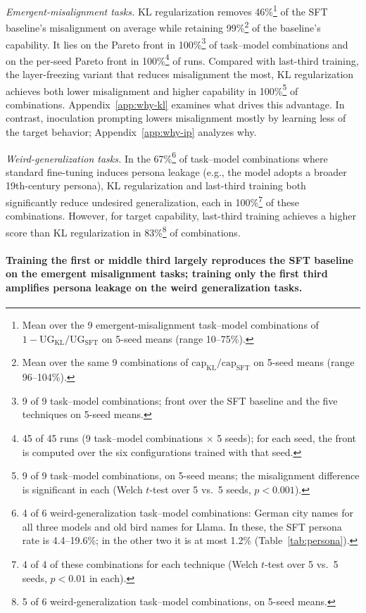 \documentclass[11pt]{article}
\newenvironment{subpoints}%
  {\begin{list}{}{\setlength{\leftmargin}{1.5em}\setlength{\topsep}{4pt}%
   \setlength{\itemsep}{6pt}\setlength{\parsep}{0pt}\setlength{\labelwidth}{0pt}%
   \setlength{\labelsep}{0pt}}}%
  {\end{list}}
\begin{document}
\begin{subpoints}
\item \emph{Emergent-misalignment tasks.} KL regularization removes 46\%\footnote{Mean over the 9
emergent-misalignment task--model combinations of
$1 - \mathrm{UG}_{\mathrm{KL}}/\mathrm{UG}_{\mathrm{SFT}}$ on 5-seed means (range 10--75\%).} of
the SFT baseline's misalignment on average while retaining 99\%\footnote{Mean over the same 9
combinations of $\mathrm{cap}_{\mathrm{KL}}/\mathrm{cap}_{\mathrm{SFT}}$ on 5-seed means (range
96--104\%).} of the baseline's capability. It lies on the Pareto front in 100\%\footnote{9 of 9
task--model combinations; front over the SFT baseline and the five techniques on 5-seed means.}
of task--model combinations and on the per-seed Pareto front in 100\%\footnote{45 of 45 runs
(9 task--model combinations $\times$ 5 seeds); for each seed, the front is computed over the six
configurations trained with that seed.} of runs. Compared with last-third training, the
layer-freezing variant that reduces misalignment the most, KL regularization achieves both lower
misalignment and higher capability in 100\%\footnote{9 of 9 task--model combinations, on 5-seed
means; the misalignment difference is significant in each (Welch $t$-test over 5 vs.\ 5 seeds,
$p < 0.001$).} of combinations. Appendix~\ref{app:why-kl} examines what drives this
advantage. In contrast, inoculation prompting lowers misalignment mostly by learning less of the
target behavior; Appendix~\ref{app:why-ip} analyzes why.

\item \emph{Weird-generalization tasks.} In the 67\%\footnote{4 of 6 weird-generalization task--model
combinations: German city names for all three models and old bird names for Llama. In these, the
SFT persona rate is 4.4--19.6\%; in the other two it is at most 1.2\% (Table~\ref{tab:persona}).}
of task--model combinations where standard fine-tuning induces persona leakage (e.g., the model
adopts a broader 19th-century persona), KL regularization and last-third training both
significantly reduce undesired generalization, each in 100\%\footnote{4 of 4 of these
combinations for each technique (Welch $t$-test over 5 vs.\ 5 seeds, $p < 0.01$ in each).} of
these combinations. However, for target capability, last-third training achieves a higher score
than KL regularization in 83\%\footnote{5 of 6 weird-generalization task--model combinations, on
5-seed means.} of combinations.
\end{subpoints}

\paragraph{Training the first or middle third largely reproduces the SFT baseline on the emergent
misalignment tasks; training only the first third amplifies persona leakage on the weird
generalization tasks.}\leavevmode
\end{document}
